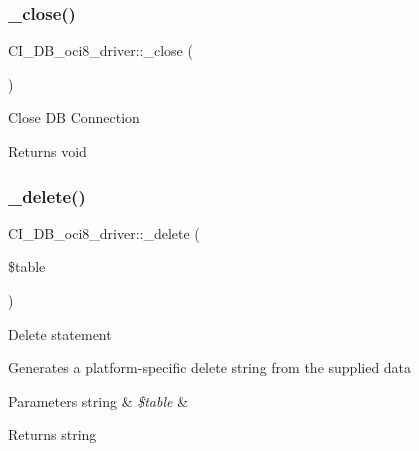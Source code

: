 \subsubsection{\texorpdfstring{\+\_\+close()}{\_close()}}
{\footnotesize\ttfamily C\+I\+\_\+\+D\+B\+\_\+oci8\+\_\+driver\+::\+\_\+close (\begin{DoxyParamCaption}{ }\end{DoxyParamCaption})\hspace{0.3cm}{\ttfamily [protected]}}

Close DB Connection

\begin{DoxyReturn}{Returns}
void 
\end{DoxyReturn}
\mbox{\label{class_c_i___d_b__oci8__driver_aed6e27750068eb2c38120fa503c310de}} 
\subsubsection{\texorpdfstring{\+\_\+delete()}{\_delete()}}
{\footnotesize\ttfamily C\+I\+\_\+\+D\+B\+\_\+oci8\+\_\+driver\+::\+\_\+delete (\begin{DoxyParamCaption}\item[{}]{\$table }\end{DoxyParamCaption})\hspace{0.3cm}{\ttfamily [protected]}}

Delete statement

Generates a platform-\/specific delete string from the supplied data


\begin{DoxyParams}[1]{Parameters}
string & {\em \$table} & \\
\hline
\end{DoxyParams}
\begin{DoxyReturn}{Returns}
string 
\end{DoxyReturn}
\mbox{\label{class_c_i___d_b__oci8__driver_ab53da6f3156300112ccfe328f30102f7}} 

